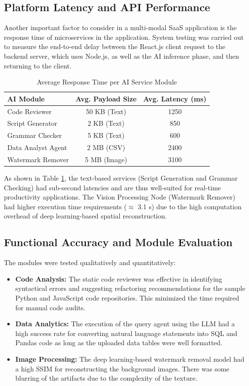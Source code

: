 \documentclass[conference]{IEEEtran}
\begin{document}
\subsection{Platform Latency and API Performance}
Another important factor to consider in a multi-modal SaaS application is the response time of microservices in the application. System testing was carried out to measure the end-to-end delay between the React.js client request to the backend server, which uses Node.js, as well as the AI inference phase, and then returning to the client.

\begin{table}[htbp]
\caption{Average Response Time per AI Service Module}
\begin{center}
\begin{tabular}{|l|c|c|}
\hline
\textbf{AI Module} & \textbf{Avg. Payload Size} & \textbf{Avg. Latency (ms)} \\
\hline
Code Reviewer & 50 KB (Text) & 1250 \\
\hline
Script Generator & 2 KB (Text) & 850 \\
\hline
Grammar Checker & 5 KB (Text) & 600 \\
\hline
Data Analyst Agent & 2 MB (CSV) & 2400 \\
\hline
Watermark Remover & 5 MB (Image) & 3100 \\
\hline
\end{tabular}
\label{tab:latency}
\end{center}
\end{table}

As shown in Table \ref{tab:latency}, the text-based services (Script Generation and Grammar Checking) had sub-second latencies and are thus well-suited for real-time productivity applications. The Vision Processing Node (Watermark Remover) had higher execution time requirements ($\approx$ 3.1 s) due to the high computation overhead of deep learning-based spatial reconstruction.



\subsection{Functional Accuracy and Module Evaluation}
The modules were tested qualitatively and quantitatively:
\begin{itemize}
    \item \textbf{Code Analysis:} The static code reviewer was effective in identifying syntactical errors and suggesting refactoring recommendations for the sample Python and JavaScript code repositories. This minimized the time required for manual code audits.
    \item \textbf{Data Analytics:} The execution of the query agent using the LLM had a high success rate for converting natural language statements into SQL and Pandas code as long as the uploaded data tables were well formatted.
    \item \textbf{Image Processing:} The deep learning-based watermark removal model had a high SSIM for reconstructing the background images. There was some blurring of the artifacts due to the complexity of the texture.
\end{itemize}
\end{document}
